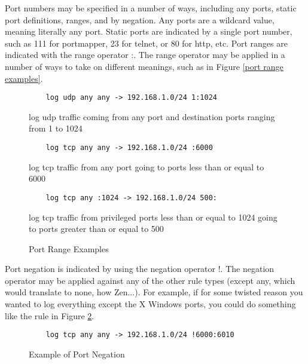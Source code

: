 \documentclass[english]{report}
\begin{document}
Port numbers may be specified in a number of ways, including any ports, static
port definitions, ranges, and by negation. Any ports are a wildcard value,
meaning literally any port. Static ports are indicated by a single port number,
such as 111 for portmapper, 23 for telnet, or 80 for http, etc. Port ranges are
indicated with the range operator :. The range operator may be applied in a
number of ways to take on different meanings, such as in Figure \ref{port range
examples}.

\begin{center}
\begin{figure}
\begin{verbatim}
    log udp any any -> 192.168.1.0/24 1:1024
\end{verbatim}

log udp traffic coming from any port and destination ports ranging from 1 to 1024

\begin{verbatim}
    log tcp any any -> 192.168.1.0/24 :6000 
\end{verbatim}

log tcp traffic from any port going to ports less than or equal to 6000

\begin{verbatim}
    log tcp any :1024 -> 192.168.1.0/24 500: 
\end{verbatim}

log tcp traffic from privileged ports less than or equal to 1024 going to ports
greater than or equal to 500

\caption{\label{port range examples}Port Range Examples}
\end{figure}
\end{center}

Port negation is indicated by using the negation operator !.  The negation
operator may be applied against any of the other rule types (except any, which
would translate to none, how Zen...). For example, if for some twisted reason
you wanted to log everything except the X Windows ports, you could do something
like the rule in Figure \ref{example port negation}.

\begin{figure}
\begin{verbatim}
    log tcp any any -> 192.168.1.0/24 !6000:6010
\end{verbatim}

\caption{\label{example port negation}Example of Port Negation}
\end{figure}
\end{document}
